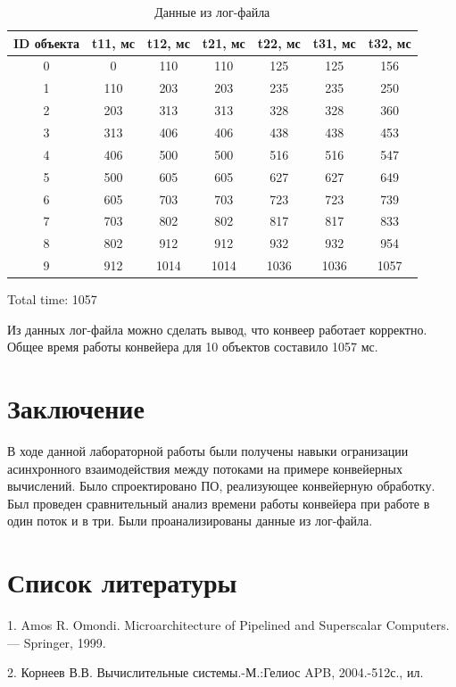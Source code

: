 \documentclass[a4paper,14pt]{report}
\begin{document}
\begin{table}[!h]
	\caption{Данные из лог-файла}
	\tabcolsep=0.11cm
		\begin{tabular}{| c | c | c | c | c | c | c |}
	 	\hline
		ID объекта & t11, мс & t12, мс & t21, мс & t22, мс & t31, мс & t32, мс \\ [0.5ex]
	 	\hline\hline
		0	& 	0 &  110 & 110 & 125 & 125 & 156  \\ \hline
		1	&	110 & 203  & 203  & 235  & 235  & 250 \\ \hline 
		2	&	203  & 313 & 313  & 328  & 328  & 360 \\ \hline 
		3	&	313  & 406 & 406  & 438  & 438  & 453 \\ \hline 
		4	&	406  & 500  & 500  & 516  & 516  & 547 \\ \hline  
		5	&	500  & 605  & 605  & 627  & 627  & 649 \\ \hline 
		6	&	605  & 703  & 703  & 723  & 723  & 739 \\ \hline 
		7	&	703  & 802  & 802  & 817  & 817  & 833 \\ \hline 
		8	&	802  & 912  & 912  & 932  & 932  & 954 \\ \hline 
		9	&	912  & 1014  & 1014  & 1036  & 1036  & 1057 \\ \hline 
	\end{tabular}
\end{table}

Total time: 1057

Из данных лог-файла можно сделать вывод, что конвеер работает корректно. Общее время работы конвейера для 10 объектов составило 1057 мс.

\chapter*{Заключение}

В ходе данной лабораторной работы были получены навыки огранизации асинхронного взаимодействия между потоками на примере конвейерных вычислений. Было спроектировано ПО, реализующее конвейерную обработку. Был проведен сравнительный анализ времени работы конвейера при работе в один поток и в три. Были проанализированы данные из лог-файла.

\chapter*{Список литературы}

1. Amos R. Omondi. Microarchitecture of Pipelined and Superscalar Computers. — Springer, 1999.

2. Корнеев В.В. Вычислительные системы.-М.:Гелиос APB,  2004.-512с., ил.
\end{document}
